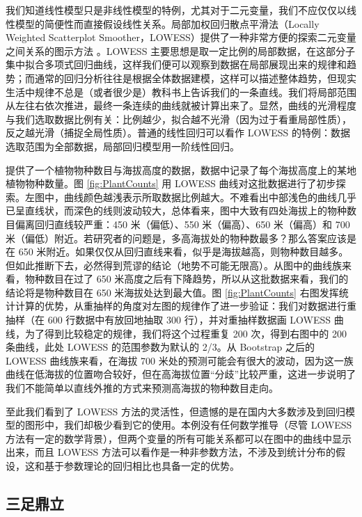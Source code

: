 \documentclass[
  b5paper,
  UTF8,twoside]{book}
\begin{document}
我们知道线性模型只是非线性模型的特例，尤其对于二元变量，我们不应仅仅以线性模型的简便性而直接假设线性关系。局部加权回归散点平滑法（Locally Weighted Scatterplot Smoother，LOWESS）提供了一种非常方便的探索二元变量之间关系的图示方法 \citep{Cleveland79}。LOWESS 主要思想是取一定比例的局部数据，在这部分子集中拟合多项式回归曲线，这样我们便可以观察到数据在局部展现出来的规律和趋势；而通常的回归分析往往是根据全体数据建模，这样可以描述整体趋势，但现实生活中规律不总是（或者很少是）教科书上告诉我们的一条直线。我们将局部范围从左往右依次推进，最终一条连续的曲线就被计算出来了。显然，曲线的光滑程度与我们选取数据比例有关：比例越少，拟合越不光滑（因为过于看重局部性质），反之越光滑（捕捉全局性质）。普通的线性回归可以看作 LOWESS 的特例：数据选取范围为全部数据，局部回归模型用一阶线性回归。

\citet{Xie08LOWESS} 提供了一个植物物种数目与海拔高度的数据，数据中记录了每个海拔高度上的某地植物物种数量。图 \ref{fig:PlantCounts} 用 LOWESS 曲线对这批数据进行了初步探索。左图中，曲线颜色越浅表示所取数据比例越大。不难看出中部浅色的曲线几乎已呈直线状，而深色的线则波动较大，总体看来，图中大致有四处海拔上的物种数目偏离回归直线较严重：450 米（偏低）、550 米（偏高）、650 米（偏高）和 700 米（偏低）附近。若研究者的问题是，多高海拔处的物种数最多？那么答案应该是在 650 米附近。如果仅仅从回归直线来看，似乎是海拔越高，则物种数目越多。但如此推断下去，必然得到荒谬的结论（地势不可能无限高）。从图中的曲线族来看，物种数目在过了 650 米高度之后有下降趋势，所以从这批数据来看，我们的结论将是物种数目在 650 米海拔处达到最大值。图 \ref{fig:PlantCounts} 右图发挥统计计算的优势，从重抽样的角度对左图的规律作了进一步验证：我们对数据进行重抽样（在 600 行数据中有放回地抽取 300 行），并对重抽样数据画 LOWESS 曲线，为了得到比较稳定的规律，我们将这个过程重复 200 次，得到右图中的 200 条曲线，此处 LOWESS 的范围参数为默认的 2/3。从 Bootstrap 之后的 LOWESS 曲线族来看，在海拔 700 米处的预测可能会有很大的波动，因为这一族曲线在低海拔的位置吻合较好，但在高海拔位置``分歧''比较严重，这进一步说明了我们不能简单以直线外推的方式来预测高海拔的物种数目走向。

至此我们看到了 LOWESS 方法的灵活性，但遗憾的是在国内大多数涉及到回归模型的图形中，我们却极少看到它的使用。本例没有任何数学推导（尽管 LOWESS 方法有一定的数学背景），但两个变量的所有可能关系都可以在图中的曲线中显示出来，而且 LOWESS 方法可以看作是一种非参数方法，不涉及到统计分布的假设，这和基于参数理论的回归相比也具备一定的优势。

\subsection{三足鼎立}\label{subsec:ternary}
\end{document}
